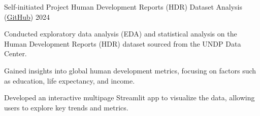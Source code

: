 \begin{cventries}
		
		\cventry
		{Self-initiated Project} %
		{Human Development Reports (HDR) Dataset Analysis (\href{https://github.com/mohammedbehjoo/UN_HDR_data_analysis}{GitHub})} %
		{} %
		{\textcolor{neutraltext}{2024}} %
		{
			\begin{cvitems} %
				\item{Conducted exploratory data analysis (EDA) and statistical analysis on the Human Development Reports (HDR) dataset sourced from the UNDP Data Center.}
				\item{Gained insights into global human development metrics, focusing on factors such as education, life expectancy, and income.}
				\item{Developed an interactive multipage Streamlit app to visualize the data, allowing users to explore key trends and metrics.}
			\end{cvitems}
		}
	
	
\end{cventries}
